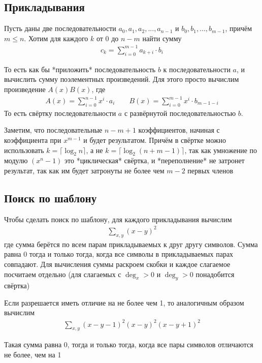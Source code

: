 \subsection{Прикладывания}

Пусть даны две последовательности $a_0, a_1, a_2, ..., a_{n - 1}$  и $b_0, b_1, ..., b_{m - 1}$, причём $m \le n$.
Хотим для каждого $k$ от $0$ до $n - m$ найти сумму
\begin{gather}
    c_k = \sum_{i = 0}^{m - 1} a_{k + i} \cdot b_i
\end{gather}

То есть как бы *приложить* последовательность $b$ к последовательности $a$, и вычислить сумму поэлементных произведений.
Для этого просто вычислим произведение $A(x)B(x)$, где
\begin{gather}
    A(x) = \sum_{i = 0}^{n - 1} x^i \cdot a_i \qquad B(x) = \sum_{i = 0}^{m - 1} x^i \cdot b_{m - 1 - i}
\end{gather}
То есть свёртку последовательности $a$ с развёрнутой последовательностью $b$.

Заметим, что последовательные $n - m + 1$ коэффициентов, начиная с коэффициента при $x^{m - 1}$ и будет результатом.
Причём в свёртке можно использовать $k = \lceil \log_2 n \rceil$, а не $k = \lceil \log_2 \left(n + m - 1\right) \rceil$,
так как умножение по модулю $(x^n - 1)$ это *циклическая* свёртка, и *переполнение* не затронет результат, так как им будет затронуты не более чем $m - 2$ первых членов



\subsection{Поиск по шаблону}

Чтобы сделать поиск по шаблону, для каждого прикладывания вычислим
\begin{gather}
    \sum_{x, y} \left(x - y\right)^2
\end{gather}
где сумма берётся по всем парам прикладываемых к друг другу символов.
Сумма равна $0$ тогда и только тогда, когда все символы в прикладываемых парах совпадают.
Для вычисления суммы раскроем скобки и каждое слагаемое посчитаем отдельно (для слагаемых с $\deg_x > 0$ и $\deg_y > 0$ понадобится свёртка)

Если разрешается иметь отличие на не более чем 1, то аналогичным образом вычислим
\begin{gather}
    \sum_{x, y} \left(x - y - 1\right)^2 \left(x - y \right)^2 \left(x - y + 1\right)^2
\end{gather}

Такая сумма равна $0$, тогда и только тогда, когда все пары символов отличаются не более, чем на 1


